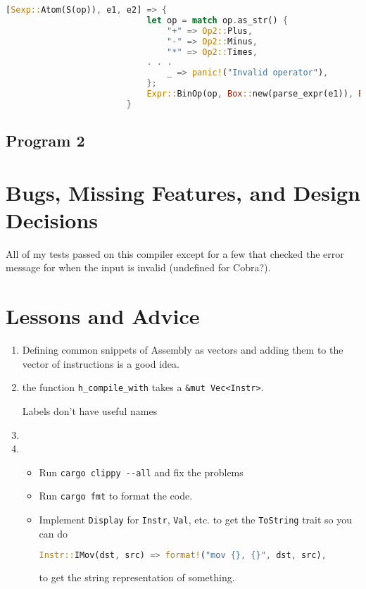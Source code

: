 \begin{enumerate}
\begin{itemize}
				\begin{lstlisting}[language=Rust]
						[Sexp::Atom(S(op)), e1, e2] => {
						    let op = match op.as_str() {
						        "+" => Op2::Plus,
						        "-" => Op2::Minus,
						        "*" => Op2::Times,
							. . .
						        _ => panic!("Invalid operator"),
						    };
						    Expr::BinOp(op, Box::new(parse_expr(e1)), Box::new(parse_expr(e2)))
						}
					\end{lstlisting}
			\end{itemize}
	\end{enumerate}

	\subsection{Program 2}

	\section{Bugs, Missing Features, and Design Decisions}

	All of my tests passed on this compiler except for a few that checked the error message for when the input is invalid (undefined for Cobra?). 

	\section{Lessons and Advice}

	\begin{enumerate}
		\item Defining common snippets of Assembly as vectors and adding them to the vector of instructions is a good idea.
		\item the function \verb|h_compile_with| takes a \verb|&mut Vec<Instr>|.

			Labels don't have useful names

		\item
		\item 
			\begin{itemize}
				\item Run \verb|cargo clippy --all| and fix the problems
				\item Run \verb|cargo fmt| to format the code.
				\item Implement \verb|Display| for \verb|Instr|, \verb|Val|, etc. to get the \verb|ToString| trait so you can do
					\begin{lstlisting}[language=Rust, numbers=none]
        					Instr::IMov(dst, src) => format!("mov {}, {}", dst, src),
					\end{lstlisting}
					to get the string representation of something.
			\end{itemize}

	\end{enumerate}

